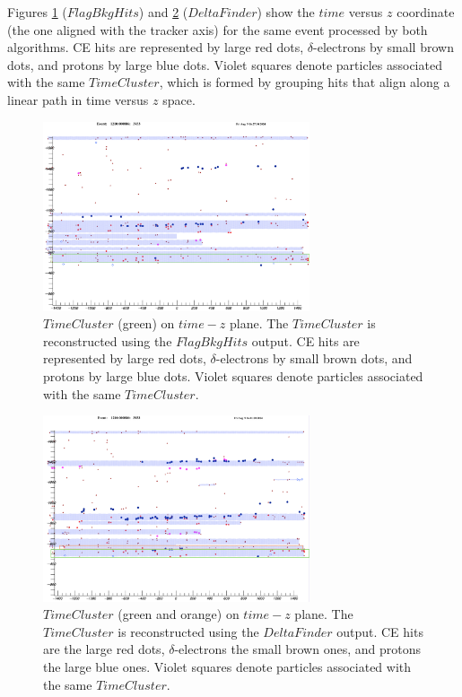 Figures \ref{fig:TZCluster1} ($FlagBkgHits$) and 
\ref{fig:TZCluster2} ($DeltaFinder$) show the 
$time$ versus $z$ coordinate 
(the one aligned with the tracker axis) for 
the same event processed by both algorithms. 
CE hits are represented by large red dots, 
$\delta$-electrons 
by small brown dots, and protons by large 
blue dots. Violet squares denote particles associated with 
the same $TimeCluster$, 
which is formed by grouping hits that 
align along a linear 
path in time versus $z$ space.
\begin{figure}[!h]
    \centering
    \includegraphics[width =0.7\textwidth]{figures/png/Screenshot_20240819_153229.png}
    \caption[$TimeCluster$ on $time-z$ plane.]{$TimeCluster$ (green) on $time-z$ plane. 
    The $TimeCluster$ is reconstructed using the $FlagBkgHits$ output.
    CE hits are represented by large red dots, $\delta$-electrons 
    by small brown dots, and protons by large blue dots. Violet 
    squares denote particles associated with the same $TimeCluster$.}
    \label{fig:TZCluster1}
\end{figure}
\begin{figure}[!h]
    \centering
    \includegraphics[width =0.7\textwidth]{figures/png/Screenshot_20240819_153730.png}
    \caption[$TimeCluster$ on $time-z$ plane.]{$TimeCluster$ (green and orange) on $time-z$ 
    plane. The $TimeCluster$ is reconstructed using the $DeltaFinder$ output.
    CE hits are the large red dots, $\delta$-electrons 
    the small brown ones, and protons the large blue ones. Violet 
    squares denote particles associated with the same $TimeCluster$.}
    \label{fig:TZCluster2}
\end{figure}
